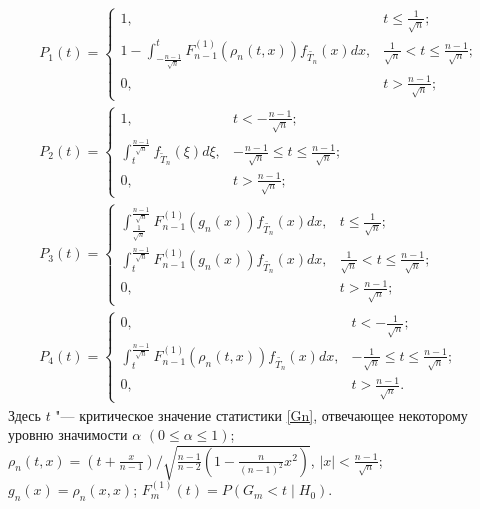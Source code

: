 \begin{gather}\label{P1}
P_1(t)= \left\{
\begin{array}{lc}
1, & t\le\frac{1}{\sqrt{n}};\\
\displaystyle 1-\int_{-\frac{n-1}{\sqrt{n}}}^{t}F_{n-1}^{(1)}(\rho_n(t, x))f_{\tilde{T_n}}(x)dx, &
\frac{1}{\sqrt{n}}<t\le\frac{n-1}{\sqrt{n}};\\
0, &t>\frac{n-1}{\sqrt{n}};
\end{array}
\right.
\\
\label{P4}
P_2(t)=
 \left\{
 \begin{array}{cc}
 1,&t<-\frac{n-1}{\sqrt{n}};\\
\displaystyle  \int_t^{\frac{n-1}{\sqrt{n}}}f_{\tilde{T}_n}(\xi)d\xi,&-\frac{n-1}{\sqrt{n}}\le t\le \frac{n-1}{\sqrt{n}};\\
 0,&t>\frac{n-1}{\sqrt{n}};
 \end{array}
 \right.
\\
\label{P4}
P_3(t)=
\left\{
\begin{array}{cc}
\displaystyle
\int_{\frac{1}{\sqrt{n}}}^{\frac{n-1}{\sqrt{n}}}F_{n-1}^{(1)}\left(g_n(x)\right)f_{\tilde{T_n}}(x)dx, & t\le\frac{1}{\sqrt{n}};\\
\displaystyle
\int_t^{\frac{n-1}{\sqrt{n}}}F_{n-1}^{(1)}\left(g_n(x)\right)f_{\tilde{T_n}}(x)dx, & \frac{1}{\sqrt{n}}<t\le\frac{n-1}{\sqrt{n}};\\
0, &t>\frac{n-1}{\sqrt{n}};
\end{array}
\right.
\\
\label{P4}
P_4(t)=\left\{
\begin{array}{cc}
0, & t<-\frac{1}{\sqrt{n}};\\
\displaystyle \int_t^{\frac{n-1}{\sqrt{n}}}F_{n-1}^{(1)}\left(\rho_n(t,x)\right)f_{\tilde{T_n}}(x)dx, &
-\frac{1}{\sqrt{n}}\le t \le \frac{n-1}{\sqrt{n}};\\
0, & t>\frac{n-1}{\sqrt{n}}.
\end{array}
\right.
\end{gather}
Здесь $t$ "--- критическое значение статистики \eqref{Gn}, отвечающее некоторому уровню значимости $\alpha$ $(0\le\alpha\le 1)$;
$\rho_n(t,x)=\left(t+\frac{x}{n-1}\right)/\sqrt{\frac{n-1}{n-2}\left(1-\frac{n}{(n-1)^2}x^2\right)}$,
$|x|<\frac{n-1}{\sqrt{n}}$; 
  $g_n(x)=\rho_n(x,x)$;  $F_{m}^{(1)}(t)=P(G_m<t\mid H_0).$
 
 


